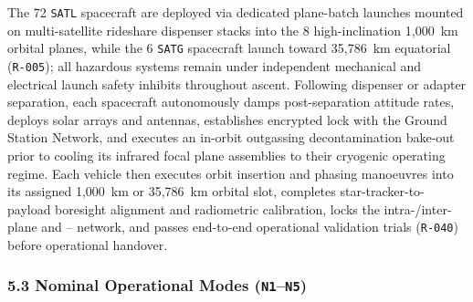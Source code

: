 The 72 \texttt{SATL} spacecraft are deployed via dedicated plane-batch launches mounted on multi-satellite rideshare dispenser stacks into the 8 high-inclination 1,000~km orbital planes, while the 6 \texttt{SATG} spacecraft launch toward 35,786~km equatorial  (\texttt{R-005}); all hazardous systems remain under independent mechanical and electrical launch safety inhibits throughout ascent. Following dispenser or adapter separation, each spacecraft autonomously damps post-separation attitude rates, deploys solar arrays and antennas, establishes encrypted   lock with the Ground Station Network, and executes an in-orbit outgassing decontamination bake-out prior to cooling its infrared focal plane assemblies to their cryogenic operating regime. Each vehicle then executes orbit insertion and phasing manoeuvres into its assigned 1,000~km  or 35,786~km  orbital slot, completes star-tracker-to-payload boresight alignment and radiometric calibration, locks the intra-/inter-plane and --  network, and passes end-to-end operational validation trials (\texttt{R-040}) before operational handover.

\subsubsection{5.3 Nominal Operational Modes (\texttt{N1}--\texttt{N5})}


